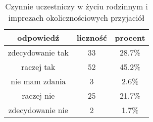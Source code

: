 \begin{table}[H]
\caption{Czynnie uczestniczy w życiu rodzinnym i imprezach okolicznościowych przyjaciół}
\centering
\begin{tabular}{ | c | c | c |}
\hline
odpowiedź & liczność & procent\\
\hline
zdecydowanie tak  &  33  & 28.7\% \\
\hline
raczej tak  &  52  & 45.2\% \\
\hline
nie mam zdania  &  3  & 2.6\% \\
\hline
raczej nie  &  25  & 21.7\% \\
\hline
zdecydowanie nie  &  2  & 1.7\% \\
\hline
\end{tabular}
\label{tab:Q24}
\end{table}
